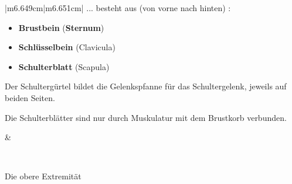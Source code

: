 \documentclass{article}
\newcommand\gT[1]{\textbf{\textup{\textcolor[rgb]{0.0,0.5019608,0.0}{#1}}}}
\newcommand\gZ[1]{\textcolor[rgb]{0.5019608,0.5019608,0.5019608}{#1}}
\begin{document}
\begin{center}
\tablehead{}\begin{supertabular}{|m{6.649cm}|m{6.651cm}|}
\hline
{\mdseries ... besteht aus (von vorne nach hinten) :}

\begin{itemize}
\item {\mdseries {}\gT{Brustbein} 
(\gT{Sternum})}

\item {\mdseries
{}\gT{Schl\"usselbein} 
\gZ{(Clavicula)}}

\item {\mdseries {}\gT{Schulterblatt} 
\gZ{(Scapula)}}

\end{itemize}
{\mdseries Der Schulterg\"urtel bildet die Gelenkspfanne f\"ur das
Schultergelenk, jeweils auf beiden Seiten.}

{\mdseries Die Schulterbl\"atter sind nur durch Muskulatur mit dem
Brustkorb verbunden.}

 &
{%
 \par}

\\\hline
\end{supertabular}
\end{center}
{\mdseries\color[rgb]{0.0,0.0,0.5019608}
Die obere Extremit\"at}
\end{document}
